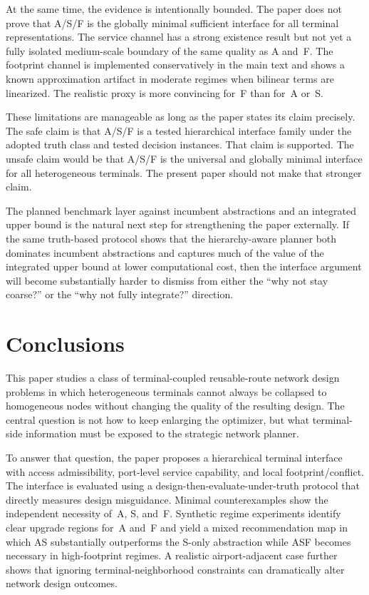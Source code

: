 \documentclass[review,authoryear]{elsarticle}
\begin{document}
At the same time, the evidence is intentionally bounded. The paper does not prove that A/S/F is the globally minimal sufficient interface for all terminal representations. The service channel has a strong existence result but not yet a fully isolated medium-scale boundary of the same quality as A and~F. The footprint channel is implemented conservatively in the main text and shows a known approximation artifact in moderate regimes when bilinear terms are linearized. The realistic proxy is more convincing for~F than for~A or~S.

These limitations are manageable as long as the paper states its claim precisely. The safe claim is that A/S/F is a tested hierarchical interface family under the adopted truth class and tested decision instances. That claim is supported. The unsafe claim would be that A/S/F is the universal and globally minimal interface for all heterogeneous terminals. The present paper should not make that stronger claim.

The planned benchmark layer against incumbent abstractions and an integrated upper bound is the natural next step for strengthening the paper externally. If the same truth-based protocol shows that the hierarchy-aware planner both dominates incumbent abstractions and captures much of the value of the integrated upper bound at lower computational cost, then the interface argument will become substantially harder to dismiss from either the ``why not stay coarse?'' or the ``why not fully integrate?'' direction.


\section{Conclusions}
\label{sec:conclusions}

This paper studies a class of terminal-coupled reusable-route network design problems in which heterogeneous terminals cannot always be collapsed to homogeneous nodes without changing the quality of the resulting design. The central question is not how to keep enlarging the optimizer, but what terminal-side information must be exposed to the strategic network planner.

To answer that question, the paper proposes a hierarchical terminal interface with access admissibility, port-level service capability, and local footprint/conflict. The interface is evaluated using a design-then-evaluate-under-truth protocol that directly measures design misguidance. Minimal counterexamples show the independent necessity of~A, S, and~F. Synthetic regime experiments identify clear upgrade regions for~A and~F and yield a mixed recommendation map in which AS substantially outperforms the S-only abstraction while ASF becomes necessary in high-footprint regimes. A realistic airport-adjacent case further shows that ignoring terminal-neighborhood constraints can dramatically alter network design outcomes.
\end{document}
